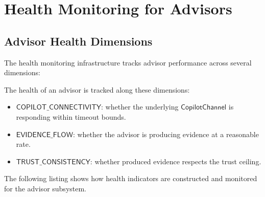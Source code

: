 \documentclass[11pt]{article}
\newcommand{\CopChan}{\mathsf{CopilotChannel}}
\begin{document}
\section{Health Monitoring for Advisors}
\label{sec:health}

\subsection{Advisor Health Dimensions}
\label{sec:health:dimensions}

The \JuGeo{} health monitoring infrastructure tracks advisor
performance across several dimensions:

\begin{definition}
\label{def:advisor-health}
The health of an advisor is tracked along these dimensions:
\begin{itemize}[leftmargin=2em]
\item $\mathsf{COPILOT\_CONNECTIVITY}$: whether the underlying
  $\CopChan$ is responding within timeout bounds.
\item $\mathsf{EVIDENCE\_FLOW}$: whether the advisor is producing
  evidence at a reasonable rate.
\item $\mathsf{TRUST\_CONSISTENCY}$: whether produced evidence
  respects the trust ceiling.
\end{itemize}
\end{definition}

The following listing shows how health indicators are constructed
and monitored for the advisor subsystem.
\end{document}
